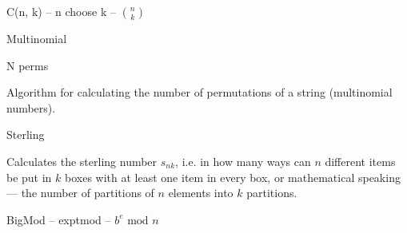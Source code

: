

\begin{algorithm}{C(n, k) -- n choose k -- ${n \choose k}$}
\end{algorithm}

\begin{algorithm}{Multinomial}
\end{algorithm}

\begin{algorithm}{N perms}

Algorithm for calculating the number of permutations of a string
(multinomial numbers).
\end{algorithm}

\begin{algorithm}{Sterling}

Calculates the sterling number $s_{nk}$, i.e. in how many ways can $n$
different items be put in $k$ boxes with at least one item in every box, or
mathematical speaking --- the number of partitions of $n$ elements into
$k$ partitions.
\end{algorithm}

\begin{algorithm}{BigMod -- exptmod -- $b^e \textrm{ mod } n$}
\end{algorithm}
